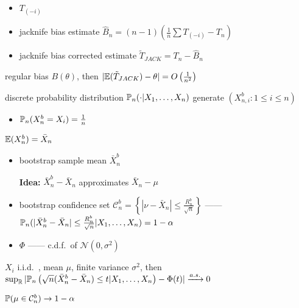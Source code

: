 \begin{itemize}
    \item $T_{(-i)}$
    \item jacknife bias estimate $\hat B_n = (n - 1) \left( \frac{1}{n} \sum  T_{(-i)} - T_n \right)$
    \item jacknife bias corrected estimate $\tilde T_{JACK} = T_n - \hat B_n$
\end{itemize}

\begin{prop}
    regular bias $B(\theta)$, then $|\mathbb{E}(\tilde T_{JACK}) - \theta| = O\left(\frac{1}{n^2}\right)$
\end{prop}

\begin{example}[Bootstrap]
    \begin{setting}
        discrete probability distribution $\Pb_n(\cdot | \ddd{X})$ generate $(X^b_{n, i}:1\leq i \leq n)$
    \end{setting}
    \begin{itemize}
        \item $\mathbb{P}_n(X_n^b = X_i) = \frac{1}{n}$
    \end{itemize}
    \begin{prop}
        $\mathbb{E}(X_n^b) = \bar X_n$
    \end{prop}
    \begin{itemize}
        \item bootstrap sample mean $\bar X_n^b$
        \item[\textbf{Idea:}] $\bar X_n^b - \bar X_n$ approximates $\bar X_n - \mu$
        \item bootstrap confidence set $\mathcal{C}_{n}^b = \left\{ |\nu - \bar X_n| \leq \frac{R_n^b}{\sqrt{n}} \right\}$ ------ $\Pb_n(|\bar X_n^b - \bar X_n| \leq \frac{R_n^b}{\sqrt{n}}|\ddd{X}) = 1 - \alpha$
        \item $\Phi$ ------ c.d.f.\ of $\mathcal{N}(0, \sigma^2)$
    \end{itemize}
    \begin{thm}
        $X_i$ i.i.d.\ , mean $\mu$, finite variance $\sigma^2$, then \\
        $\sup_\R |\Pb_n \left( \sqrt{n} (\bar X_n^b - \bar X_n) \leq t | \ddd{X} \right) - \Phi(t)| \rightarrowas 0$
    \end{thm}
    \begin{fact}
        $\mathbb{P}(\mu \in \mathcal{C}_n^b) \rightarrow 1 - \alpha$
    \end{fact}
    \begin{lemma}\,

\end{lemma}
\end{example}
